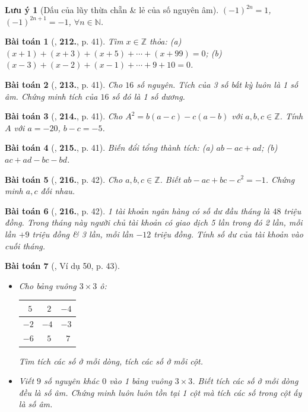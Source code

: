 \documentclass{article}
\numberwithin{equation}{section}
\newtheorem{baitoan}{Bài toán}
\newtheorem{luuy}{Lưu ý}[section]
\begin{document}
\begin{luuy}[Dấu của lũy thừa chẵn \& lẻ của số nguyên âm]
	$(-1)^{2n} = 1$, $(-1)^{2n+1} = -1$, $\forall n\in\mathbb{N}$.
\end{luuy}

\begin{baitoan}[\cite{Tuyen_Toan_6}, \textbf{212.}, p. 41]
	Tìm $x\in\mathbb{Z}$ thỏa: (a) $(x + 1) + (x + 3) + (x + 5) + \cdots + (x + 99) = 0$; (b) $(x - 3) + (x - 2) + (x - 1) + \cdots + 9 + 10 = 0$.
\end{baitoan}

\begin{baitoan}[\cite{Tuyen_Toan_6}, \textbf{213.}, p. 41]
	Cho $16$ số nguyên. Tích của 3 số bất kỳ luôn là 1 số âm. Chứng minh tích của $16$ số đó là 1 số dương.
\end{baitoan}

\begin{baitoan}[\cite{Tuyen_Toan_6}, \textbf{214.}, p. 41]
	Cho $A^2 = b(a - c) - c(a - b)$ với $a,b,c\in\mathbb{Z}$. Tính $A$ với $a = -20$, $b - c = -5$.
\end{baitoan}

\begin{baitoan}[\cite{Tuyen_Toan_6}, \textbf{215.}, p. 41]
	Biến đổi tổng thành tích: (a) $ab - ac + ad$; (b) $ac + ad - bc - bd$.
\end{baitoan}

\begin{baitoan}[\cite{Tuyen_Toan_6}, \textbf{216.}, p. 42]
	Cho $a,b,c\in\mathbb{Z}$. Biết $ab - ac + bc - c^2 = -1$. Chứng minh $a,c$ đối nhau.
\end{baitoan}

\begin{baitoan}[\cite{Tuyen_Toan_6}, \textbf{216.}, p. 42]
	1 tài khoản ngân hàng có số dư đầu tháng là $48$ triệu đồng. Trong tháng này người chủ tài khoản có giao dịch 5 lần trong đó 2 lần, mỗi lần $+9$ triệu đồng \& 3 lần, mỗi lần $-12$ triệu đồng. Tính số dư của tài khoản vào cuối tháng.
\end{baitoan}

\begin{baitoan}[\cite{Binh_Toan_6_tap_1}, Ví dụ 50, p. 43]
	\begin{itemize}
		\item[(a)] Cho bảng vuông $3\times 3$ ô:
		\begin{table}[H]
			\centering
			\begin{tabular}{|c|c|c|}
				\hline
				$\ \ 5$ & $\ \ 2$ & $-4$ \\
				\hline
				$-2$ & $-4$ & $-3$ \\
				\hline
				$-6$ & $\ \ 5$ & $\ \ 7$ \\
				\hline
			\end{tabular}
		\end{table}
		Tìm tích các số ở mỗi dòng, tích các số ở mỗi cột.
		\item[(b)] Viết $9$ số nguyên khác $0$ vào 1 bảng vuông $3\times 3$. Biết tích các số ở mỗi dòng đều là số âm. Chứng minh luôn luôn tồn tại 1 cột mà tích các số trong cột ấy là số âm.
	\end{itemize}
\end{baitoan}
\end{document}
